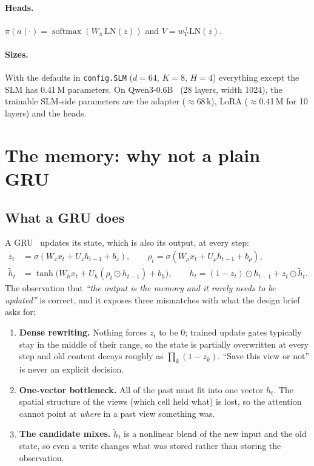\documentclass[11pt,a4paper]{article}
\newcommand{\code}[1]{\texttt{\small #1}}
\begin{document}
\paragraph{Heads.} $\pi(a\mid\cdot) = \operatorname{softmax}(W_\pi\,\mathrm{LN}(z))$ and $V = w_V^\top \mathrm{LN}(z)$.

\paragraph{Sizes.} With the defaults in \code{config.SLM} ($d{=}64$, $K{=}8$, $H{=}4$) everything except the SLM has
0.41\,M parameters. On Qwen3-0.6B~\cite{qwen3} (28 layers, width 1024), the trainable SLM-side parameters are the adapter
($\approx$68\,k), LoRA ($\approx$0.41\,M for 10 layers) and the heads.

\section{The memory: why not a plain GRU}
\label{sec:memory}

\subsection{What a GRU does}

A GRU~\cite{cho2014gru} updates its state, which is also its output, at every step:
\begin{align}
z_t &= \sigma(W_z x_t + U_z h_{t-1} + b_z), \qquad
\rho_t = \sigma(W_\rho x_t + U_\rho h_{t-1} + b_\rho), \\
\tilde h_t &= \tanh\big(W_h x_t + U_h(\rho_t \odot h_{t-1}) + b_h\big), \qquad
h_t = (1-z_t)\odot h_{t-1} + z_t \odot \tilde h_t .
\end{align}
The observation that \emph{``the output is the memory and it rarely needs to be updated''} is correct, and it exposes
three mismatches with what the design brief asks for:
\begin{enumerate}
  \item \textbf{Dense rewriting.} Nothing forces $z_t$ to be 0; trained update gates typically stay in the middle of
  their range, so the state is partially overwritten at every step and old content decays roughly as
  $\prod_k(1-z_k)$. ``Save this view or not'' is never an explicit decision.
  \item \textbf{One-vector bottleneck.} All of the past must fit into one vector $h_t$. The spatial structure of the
  views (which cell held what) is lost, so the attention cannot point at \emph{where} in a past view something was.
  \item \textbf{The candidate mixes.} $\tilde h_t$ is a nonlinear blend of the new input and the old state, so even a
  write changes what was stored rather than storing the observation.
\end{enumerate}
\end{document}
